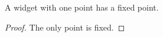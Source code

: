 \begin{proposition}\label{sy-999D}
A widget with one point has a fixed point.
\end{proposition}
\begin{proof}
The only point is fixed.
\end{proof}
